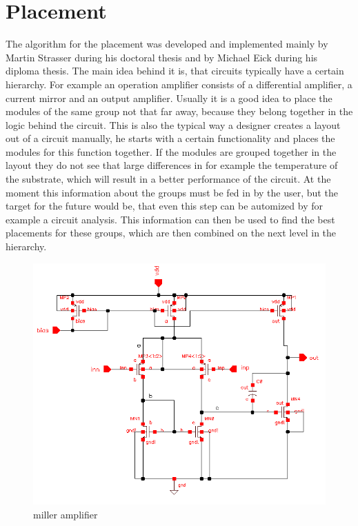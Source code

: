 \chapter{Placement}
The algorithm for the placement was developed and implemented mainly by Martin Strasser during his doctoral thesis and by Michael Eick during his diploma thesis. The main idea behind it is, that circuits typically have a certain hierarchy. For example an operation amplifier  consists of a differential amplifier, a current mirror and an output amplifier. Usually it is a good idea to place the modules of the same group not that far away, because they belong together in the logic behind the circuit. This is also the typical way a designer creates a layout out of a circuit manually, he starts with a certain functionality and places the modules for this function together. If the modules are grouped together in the layout  they do not see that large differences in for example the temperature of the substrate, which will result in a better performance of the circuit.
At the moment this information about the groups must be fed in by the user, but the target for the future would be, that even this step can be automized by for example a circuit analysis. This information can then be used to find the best placements for these groups, which are then combined on the next level in the hierarchy.

\begin{figure}
	\centering
	\includegraphics[scale=0.6]{FIG/miller_amplifier_schematic.png}
	\caption{miller amplifier}
	\label{fig:miller_amplifier_schematic}
\end{figure}

